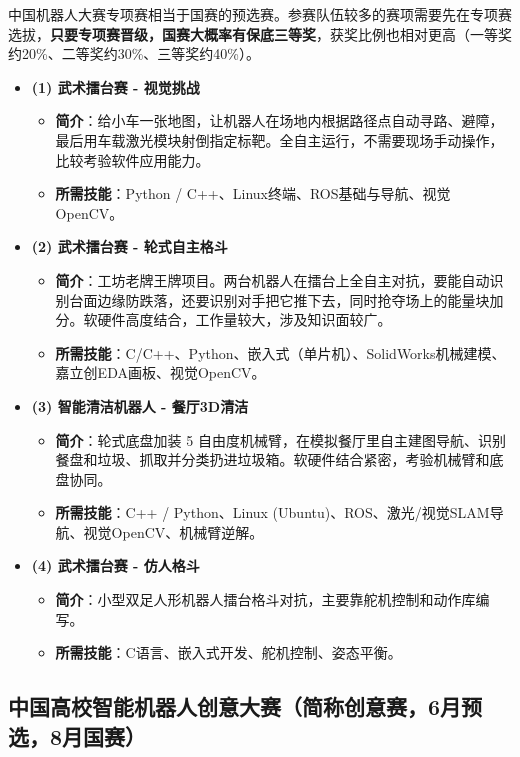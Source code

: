 \documentclass[a4paper,11pt,oneside]{scrreprt}
\begin{document}
中国机器人大赛专项赛相当于国赛的预选赛。参赛队伍较多的赛项需要先在专项赛选拔，\textbf{只要专项赛晋级，国赛大概率有保底三等奖}，获奖比例也相对更高（一等奖约20\%、二等奖约30\%、三等奖约40\%）。

\begin{itemize}
    \item \textbf{(1) 武术擂台赛 - 视觉挑战}
    \begin{itemize}
        \item \textbf{简介}：给小车一张地图，让机器人在场地内根据路径点自动寻路、避障，最后用车载激光模块射倒指定标靶。全自主运行，不需要现场手动操作，比较考验软件应用能力。
        \item \textbf{所需技能}：Python / C++、Linux终端、ROS基础与导航、视觉OpenCV。
    \end{itemize}
    \item \textbf{(2) 武术擂台赛 - 轮式自主格斗}
    \begin{itemize}
        \item \textbf{简介}：工坊老牌王牌项目。两台机器人在擂台上全自主对抗，要能自动识别台面边缘防跌落，还要识别对手把它推下去，同时抢夺场上的能量块加分。软硬件高度结合，工作量较大，涉及知识面较广。
        \item \textbf{所需技能}：C/C++、Python、嵌入式（单片机）、SolidWorks机械建模、嘉立创EDA画板、视觉OpenCV。
    \end{itemize}
    \item \textbf{(3) 智能清洁机器人 - 餐厅3D清洁}
    \begin{itemize}
        \item \textbf{简介}：轮式底盘加装 5 自由度机械臂，在模拟餐厅里自主建图导航、识别餐盘和垃圾、抓取并分类扔进垃圾箱。软硬件结合紧密，考验机械臂和底盘协同。
        \item \textbf{所需技能}：C++ / Python、Linux (Ubuntu)、ROS、激光/视觉SLAM导航、视觉OpenCV、机械臂逆解。
    \end{itemize}
    \item \textbf{(4) 武术擂台赛 - 仿人格斗}
    \begin{itemize}
        \item \textbf{简介}：小型双足人形机器人擂台格斗对抗，主要靠舵机控制和动作库编写。
        \item \textbf{所需技能}：C语言、嵌入式开发、舵机控制、姿态平衡。
    \end{itemize}
\end{itemize}

\subsection{中国高校智能机器人创意大赛（简称创意赛，6月预选，8月国赛）}
\end{document}
